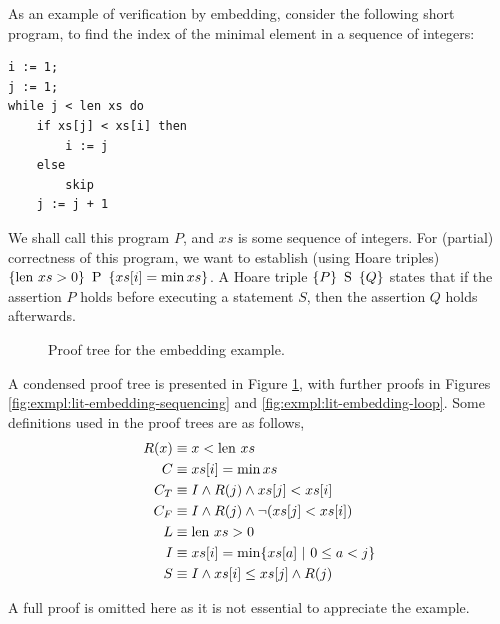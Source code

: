 \begin{example}
  \label{exmpl:lit-embedding}
  As an example of verification by embedding, consider the following
  short program, to find the index of the minimal element in a
  sequence of integers:

\begin{lstlisting}
i := 1;
j := 1;
while j < len xs do
    if xs[j] < xs[i] then
        i := j
    else
        skip
    j := j + 1
\end{lstlisting}

  We shall call this program $P$, and $xs$ is some sequence of
  integers. For (partial) correctness of this program, we want to
  establish (using Hoare triples) $\htriple{\len xs > 0}{P}{xs[i] =
    \min xs}$. A Hoare triple $\htriple{P}{S}{Q}$ states that if the
  assertion $P$ holds before executing a statement $S$, then the
  assertion $Q$ holds afterwards.

  \begin{figure}[t]
    \centering
    \begin{prooftree}


    \end{prooftree}
    \caption{Proof tree for the embedding example.}
    \label{fig:exmpl:lit-embedding-tree}
  \end{figure}

  A condensed proof tree is presented in Figure
  \ref{fig:exmpl:lit-embedding-tree}, with further proofs in Figures
  \ref{fig:exmpl:lit-embedding-sequencing} and
  \ref{fig:exmpl:lit-embedding-loop}. Some definitions used in the
  proof trees are as follows,
  \begin{align*}
    R(x) &\equiv x < \len xs\\
    C    &\equiv xs[i] = \min xs\\
    C_{T} & \equiv I \land R(j) \land xs[j] < xs[i]\\
    C_{F} & \equiv I \land R(j) \land \lnot(xs[j] < xs[i])\\
    L    & \equiv \len xs > 0\\
    I    & \equiv xs[i] = \min \{xs[a]~|~0 \leq a < j\}\\
    S    & \equiv I \land xs[i] \leq xs[j] \land R(j)
  \end{align*}

  A full proof is omitted here as it is not essential to appreciate
  the example.
\end{example}

